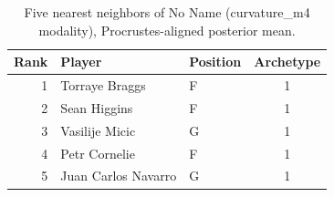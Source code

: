 \begin{table}[htbp]
  \centering\small
  \begin{tabular}{rllc}
    \toprule
    Rank & Player & Position & Archetype \\
    \midrule
    1 & Torraye Braggs & F & 1 \\
    2 & Sean Higgins & F & 1 \\
    3 & Vasilije Micic & G & 1 \\
    4 & Petr Cornelie & F & 1 \\
    5 & Juan Carlos Navarro & G & 1 \\
    \bottomrule
  \end{tabular}
  \caption{Five nearest neighbors of No Name (curvature_m4 modality), Procrustes-aligned posterior mean.}
  \label{tab:No_Name_neighbors_curvature_m4}
\end{table}

